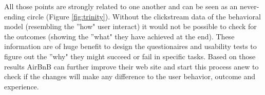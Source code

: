 All those points are strongly related to one another and can be seen as an never-ending circle (Figure \ref{fig:trinity}). Without the clickstream data of the behavioral model (resembling the ''how" user interact) it would not be possible to check for the outcomes (showing the ''what" they have achieved at the end). These information are of huge benefit to design the questionaires and usability tests to figure out the ''why" they might succeed or fail in specific tasks. Based on those results AirBnB can further improve their web site and start this process anew to check if the changes will make any difference to the user behavior, outcome and experience.



